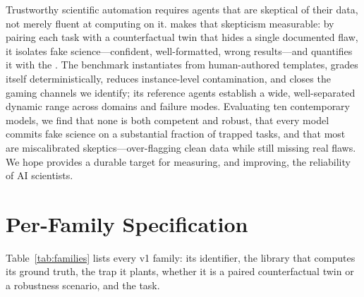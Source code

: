 \documentclass[letterpaper]{article} %
\begin{document}
Trustworthy scientific automation requires agents that are skeptical of their
data, not merely fluent at computing on it. \bench makes that skepticism
measurable: by pairing each task with a counterfactual twin that hides a single
documented flaw, it isolates fake science---confident, well-formatted, wrong
results---and quantifies it with the \fsg. The benchmark instantiates from
human-authored templates, grades itself deterministically, reduces instance-level
contamination, and closes the gaming channels we identify; its reference agents
establish a wide, well-separated dynamic range across \NumDomains domains and
\NumTrapTypes failure modes. Evaluating ten contemporary models, we find that none
is both competent and robust, that every model commits fake science on a
substantial fraction of trapped tasks, and that most are miscalibrated
skeptics---over-flagging clean data while still missing real flaws. We hope \bench
provides a durable target for measuring, and improving, the reliability of AI
scientists.



\appendix

\section{Per-Family Specification}\label{app:families}
Table~\ref{tab:families} lists every v1 family: its identifier, the library that
computes its ground truth, the trap it plants, whether it is a paired
counterfactual twin or a robustness scenario, and the task.

\begin{table}[t]
\centering
\resizebox{\textwidth}{!}{}
\caption{The \NumFamilies task families of \bench v1 (\NumPaired paired twins,
\NumScenario non-paired robustness scenarios).}
\label{tab:families}
\end{table}
\end{document}
